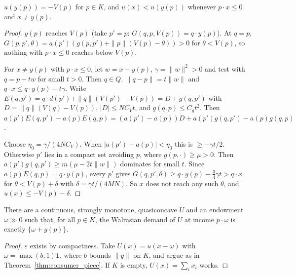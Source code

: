 \begin{lemma}
\label{lem:std_gap}
\leanok
{}
$u(y(p)) = -V(p)$ for $p \in K$, and $u(x) < u(y(p))$ whenever $p \cdot x \le 0$ and $x \ne y(p)$.
\end{lemma}
\begin{proof}
\leanok
$y(p)$ reaches $V(p)$ (take $p' = p$: $G(q,p,V(p)) = q\cdot y(p)$). At $q = p$, $G(p,p',\theta) = a(p')(g(p,p') + \|p\|(V(p) - \theta)) > 0$
for $\theta < V(p)$, so nothing with $p\cdot x \le 0$ reaches below $V(p)$.

For $x \ne y(p)$ with $p\cdot x \le 0$, let $w = x - y(p)$, $\gamma = \|w\|^2 > 0$ and test with $q = p - t w$ for small $t > 0$.
Then $q \in Q$, $\|q - p\| = t\|w\|$ and $q \cdot x \le q\cdot y(p) - t\gamma$. Write $E(q,p') = q\cdot d(p') + \|q\|(V(p') - V(p)) =
D + g(q,p')$ with $D = \|q\|(V(q) - V(p))$, $|D| \le N C_V t$, and $g(q,p) \le C_g t^2$. Then
$a(p')E(q,p') - a(p)E(q,p) = (a(p') - a(p))D + a(p')g(q,p') - a(p)g(q,p)$.

Choose $\eta_0 = \gamma/(4NC_V)$. When $|a(p') - a(p)| < \eta_0$ this is $\ge -\gamma t/2$. Otherwise $p'$ lies in a compact set
avoiding $p$, where $g(p,\cdot) \ge \mu > 0$. Then $a(p')g(q,p') \ge m(\mu - 2t\|w\|)$ dominates for small $t$. Since
$a(p)E(q,p) = q\cdot y(p)$, every $p'$ gives
$G(q,p',\theta) \ge q\cdot y(p) - \tfrac34\gamma t > q\cdot x$ for $\theta < V(p) + \delta$ with $\delta = \gamma t/(4MN)$.
So $x$ does not reach any such $\theta$, and $u(x) \le -V(p) - \delta$.
\end{proof}

\begin{theorem}
\label{thm:std_consumer_piece}
\leanok
{}
There are a continuous, strongly monotone, quasiconcave $U$ and an endowment $\omega \gg 0$ such that, for all $p \in K$, the
Walrasian demand of $U$ at income $p\cdot\omega$ is exactly $\{\omega + y(p)\}$.
\end{theorem}
\begin{proof}
\leanok
$\varepsilon$ exists by compactness. Take $U(x) = u(x - \omega)$ with $\omega = \max(b,1)\mathbf 1$, where $b$ bounds $\|y\|$ on $K$, and
argue as in Theorem~\ref{thm:consumer_piece}. If $K$ is empty, $U(x) = \sum_i x_i$ works.
\end{proof}

